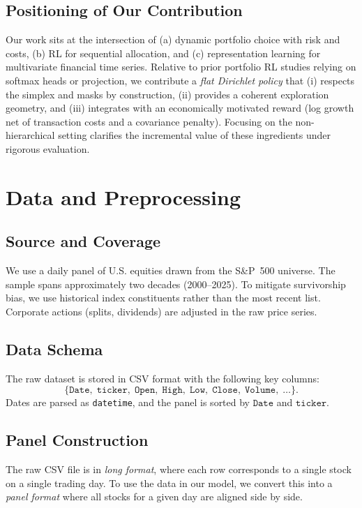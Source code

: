 \documentclass[10pt,leqno]{amsart}
\begin{document}
\subsection{Positioning of Our Contribution}
Our work sits at the intersection of (a) dynamic portfolio choice with risk and costs, (b) RL for sequential allocation, and (c) representation learning for multivariate financial time series. Relative to prior portfolio RL studies relying on softmax heads or projection, we contribute a \emph{flat Dirichlet policy} that (i) respects the simplex and masks by construction, (ii) provides a coherent exploration geometry, and (iii) integrates with an economically motivated reward (log growth net of transaction costs and a covariance penalty). Focusing on the non-hierarchical setting clarifies the incremental value of these ingredients under rigorous evaluation.

\section{Data and Preprocessing}

\subsection{Source and Coverage}
We use a daily panel of U.S. equities drawn from the S\&P~500 universe. The sample spans approximately two decades (2000--2025). To mitigate survivorship bias, we use historical index constituents rather than the most recent list. Corporate actions (splits, dividends) are adjusted in the raw price series.

\subsection{Data Schema}
The raw dataset is stored in CSV format with the following key columns:
\[
\{\texttt{Date},\; \texttt{ticker},\; \texttt{Open},\; \texttt{High},\; \texttt{Low},\; \texttt{Close},\; \texttt{Volume},\; \ldots \}.
\]
Dates are parsed as \texttt{datetime}, and the panel is sorted by $\texttt{Date}$ and $\texttt{ticker}$.

\subsection{Panel Construction}

The raw CSV file is in \emph{long format}, where each row corresponds to a single stock on a single trading day. To use the data in our model, we convert this into a \emph{panel format} where all stocks for a given day are aligned side by side. 
\end{document}
